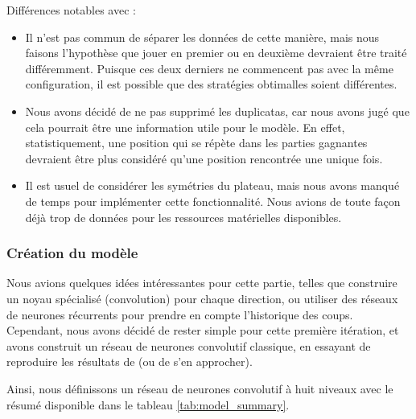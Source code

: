 Différences notables avec \cite{Liskowski_2018} :
\begin{itemize}
    \item Il n'est pas commun de séparer les données de cette manière, mais nous faisons l'hypothèse que jouer en premier ou en deuxième devraient être traité différemment. Puisque ces deux derniers ne commencent pas avec la même configuration, il est possible que des stratégies obtimalles soient différentes.
    \item Nous avons décidé de ne pas supprimé les duplicatas, car nous avons jugé que cela pourrait être une information utile pour le modèle. En effet, statistiquement, une position qui se répète dans les parties gagnantes devraient être plus considéré qu'une position rencontrée une unique fois.
    \item Il est usuel de considérer les symétries du plateau, mais nous avons manqué de temps pour implémenter cette fonctionnalité. Nous avions de toute façon déjà trop de données pour les ressources matérielles disponibles.
\end{itemize}

\subsubsection{Création du modèle}
\label{subsubsec:model}
Nous avions quelques idées intéressantes pour cette partie, telles que construire un noyau spécialisé (convolution) pour chaque direction, ou utiliser des réseaux de neurones récurrents pour prendre en compte l'historique des coups. Cependant, nous avons décidé de rester simple pour cette première itération, et avons construit un réseau de neurones convolutif classique, en essayant de reproduire les résultats de \cite{Liskowski_2018} (ou de s'en approcher).

Ainsi, nous définissons un réseau de neurones convolutif à huit niveaux avec le résumé disponible dans le tableau \ref{tab:model_summary}.

